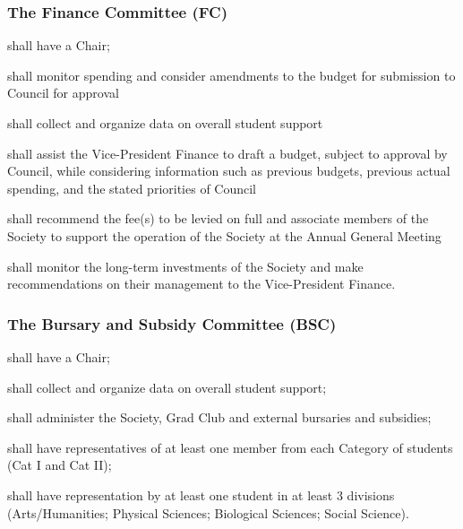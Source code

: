 \subsubsection{The Finance Committee (FC)}
\begin{longenum}[ label*=\thesubsubsection.\arabic*., align=left]
	\item shall have a Chair;
    \item shall monitor spending and consider amendments to the budget for submission to Council for approval
    \item shall collect and organize data on overall student support
    \item shall assist the Vice-President Finance to draft a budget, subject to approval by Council, while considering information such as previous budgets, previous actual spending, and the stated priorities of Council
    \item shall recommend the fee(s) to be levied on full and associate members of the Society to support the operation of the Society at the Annual General Meeting
    \item shall monitor the long-term investments of the Society and make recommendations on their management to the Vice-President Finance.
\end{longenum}

\subsubsection{The Bursary and Subsidy Committee (BSC)}
\begin{longenum}[ label*=\thesubsubsection.\arabic*., align=left]
	\item shall have a Chair;
    \item shall collect and organize data on overall student support; 
    \item shall administer the Society, Grad Club and external bursaries and subsidies;
    \item shall have representatives of at least one member from each Category of students (Cat I and Cat II);
    \item shall have representation by at least one student in at least 3 divisions (Arts/Humanities; Physical Sciences; Biological Sciences; Social Science).
\end{longenum}

